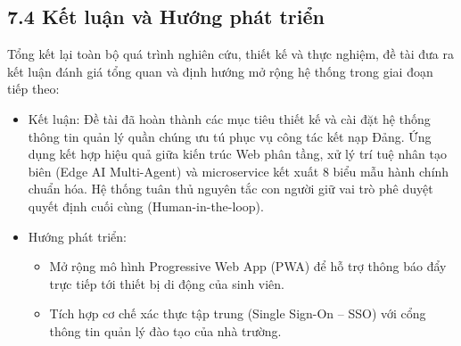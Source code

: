 \documentclass[12pt,a4paper]{report}
\begin{document}
\subsection*{7.4 Kết luận và Hướng phát triển}
Tổng kết lại toàn bộ quá trình nghiên cứu, thiết kế và thực nghiệm, đề tài đưa ra kết luận đánh giá tổng quan và định hướng mở rộng hệ thống trong giai đoạn tiếp theo:
\begin{itemize}[label=--,leftmargin=*]
  \item Kết luận: Đề tài đã hoàn thành các mục tiêu thiết kế và cài đặt hệ thống thông tin quản lý quần chúng ưu tú phục vụ công tác kết nạp Đảng. Ứng dụng kết hợp hiệu quả giữa kiến trúc Web phân tầng, xử lý trí tuệ nhân tạo biên (Edge AI Multi-Agent) và microservice kết xuất 8 biểu mẫu hành chính chuẩn hóa. Hệ thống tuân thủ nguyên tắc con người giữ vai trò phê duyệt quyết định cuối cùng (Human-in-the-loop).
  \item Hướng phát triển:
        \begin{itemize}[label=--,leftmargin=*]
          \item Mở rộng mô hình Progressive Web App (PWA) để hỗ trợ thông báo đẩy trực tiếp tới thiết bị di động của sinh viên.
          \item Tích hợp cơ chế xác thực tập trung (Single Sign-On -- SSO) với cổng thông tin quản lý đào tạo của nhà trường.
        \end{itemize}
\end{itemize}

\makeatletter
\let\cleardoublepage\oldcleardoublepage
\let\clearpage\oldclearpage
\makeatother

\cleardoublepage
\renewcommand{\bibname}{TÀI LIỆU THAM KHẢO}
\renewcommand{\refname}{TÀI LIỆU THAM KHẢO}


\cleardoublepage
\end{document}
